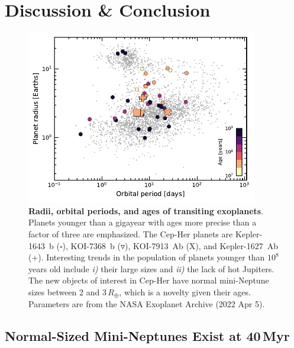 \documentclass[12pt,twocolumn]{aastex63}
\begin{document}
\section{Discussion \& Conclusion}
\label{sec:disc_conc}

\begin{figure}[!t]
	\begin{center}
		\leavevmode
		\includegraphics[width=0.9\textwidth]{f4.pdf}
	\end{center}
	\vspace{-0.6cm}
	\caption{
		{\bf Radii, orbital periods, and ages of transiting exoplanets}.
    Planets younger than a gigayear with ages more precise than a
    factor of three are emphasized. The Cep-Her planets are
    Kepler-1643~b ($\square$), KOI-7368~b ($\triangledown$),
    KOI-7913~Ab (X), and Kepler-1627~Ab (+).  Interesting trends in
    the population of planets younger than $10^8$ years old include {\it i)} their
    large sizes and {\it ii)} the lack of hot Jupiters.  The new
    objects of interest in Cep-Her have normal mini-Neptune sizes
    between 2 and 3\,$R_\oplus$, which is a novelty given their ages.
    Parameters are from the NASA Exoplanet Archive (2022 Apr 5).
		\label{fig:rp_period_age}
	}
\end{figure}


\subsection{Normal-Sized Mini-Neptunes Exist at 40$\,$Myr}
\label{subsec:sizes}
\end{document}
